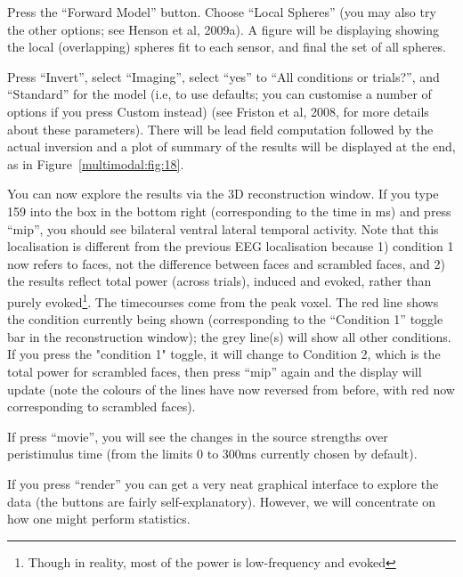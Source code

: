 Press the ``Forward Model'' button. Choose ``Local Spheres'' (you may also try the other options; see Henson et al, 2009a). A figure will be displaying showing the local (overlapping) spheres fit to each sensor, and final the set of all spheres.

Press ``Invert'', select ``Imaging'', select ``yes'' to ``All conditions or trials?'', and ``Standard'' for the model (i.e, to use defaults; you can customise a number of options if you press Custom instead) (see Friston et al, 2008, for more details about these parameters). There will be lead field computation followed by the actual inversion and a plot of summary of the results will be displayed at the end, as in Figure~\ref{multimodal:fig:18}.

You can now explore the results via the 3D reconstruction window. If you type 159 into the box in the bottom right (corresponding to the time in ms) and press ``mip'', you should see bilateral ventral lateral temporal activity. Note that this localisation is different from the previous EEG localisation because 1) condition 1 now refers to faces, not the difference between faces and scrambled faces, and 2) the results reflect total power (across trials), induced and evoked, rather than purely evoked\footnote{Though in reality, most of the power is low-frequency and evoked}. The timecourses come from the peak voxel. The red line shows the condition currently being shown (corresponding to the ``Condition 1'' toggle bar in the reconstruction window); the grey line(s) will show all other conditions. If you press the "condition 1" toggle, it will change to Condition 2, which is the total power for scrambled faces, then press ``mip'' again and the display will update (note the colours of the lines have now reversed from before, with red now corresponding to scrambled faces).

If press ``movie'', you will see the changes in the source strengths over peristimulus time (from the limits 0 to 300ms currently chosen by default).

If you press ``render'' you can get a very neat graphical interface to explore the data (the buttons are fairly self-explanatory). However, we will concentrate on how one might perform statistics.

